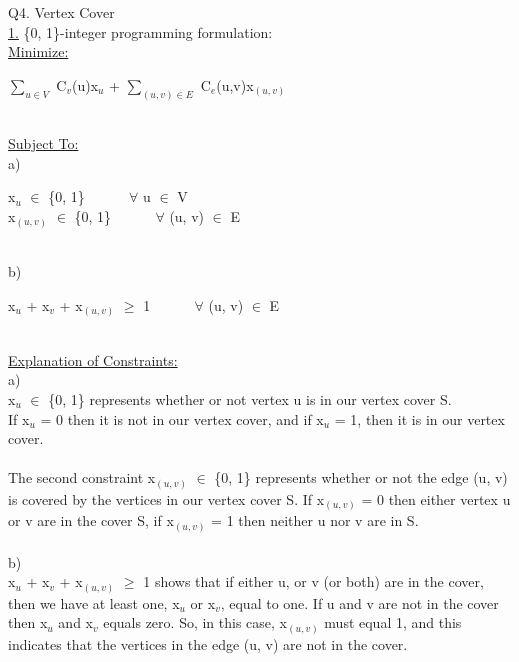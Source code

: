 \documentclass[10pt]{csc_assignment}
\begin{document}
\begin{description}
\begin{flushleft}
\newpage
\item[Q4. Vertex Cover]
~\\
\underline{1.} \{0, 1\}-integer programming formulation:\\
\underline{Minimize:}\\
\hspace*{1cm}\parbox{15cm}{
$\sum_{u \in V}$ C$_{v}$(u)x$_{u}$ + $\sum_{(u, v) \in E}$ C$_{e}$(u,v)x$_{(u, v)}$
}\\
\underline{Subject To:}\\
a) \\
\hspace*{1cm}\parbox{15cm}{
x$_{u}$ $\in$ \{0, 1\} ~~~~~ $\forall$ u $\in$ V\\ 
x$_{(u, v)}$ $\in$ \{0, 1\} ~~~~~ $\forall$ (u, v) $\in$ E\\ 
}\\
b)\\
\hspace*{1cm}\parbox{15cm}{
x$_{u}$ + x$_{v}$ + x$_{(u, v)}$ $\geqslant$ 1 ~~~~~ $\forall$ (u, v) $\in$ E\\
}\\
\underline{Explanation of Constraints:}\\

a)\\
 x$_{u}$ $\in$ \{0, 1\} represents whether or not vertex u is  in our vertex cover S.\\
 If x$_{u}$ = 0 then it is not in our vertex cover, and if x$_{u}$ = 1, then it is in our vertex cover.\\
~\\
The second constraint x$_{(u, v)}$ $\in$ \{0, 1\} represents whether or not the edge (u, v) is covered by the vertices in our vertex cover S. If x$_{(u, v)}$ = 0 then either vertex u or v are in the cover S, if x$_{(u, v)}$ = 1 then neither u nor v are in S.\\
~\\
b)\\
 x$_{u}$ + x$_{v}$ + x$_{(u, v)}$ $\geqslant$ 1 shows that if either u, or v (or both) are in the cover, then we have at least one,  x$_{u}$ or  x$_{v}$, equal to one. If u and v are not in the cover then  x$_{u}$ and  x$_{v}$ equals zero. So, in this case, x$_{(u, v)}$ must equal 1, and this indicates that the vertices in the edge (u, v) are not in the cover.\\
~\\


\end{flushleft}
\end{description}
\end{document}
